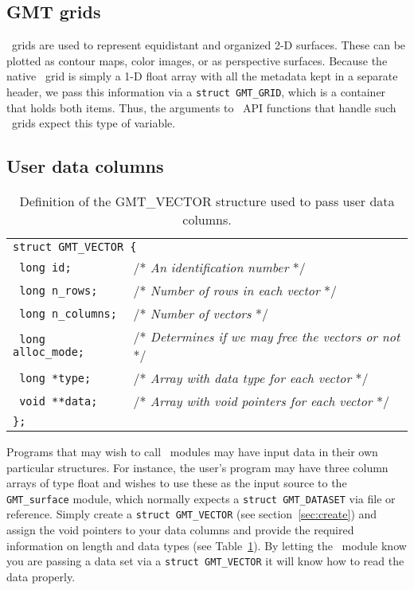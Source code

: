\documentclass{report}
\begin{document}
\subsection{GMT grids}

\GMT\ grids are used to represent equidistant and organized 2-D surfaces.  These can be
plotted as contour maps, color images, or as perspective surfaces.  Because the native
\GMT\ grid is simply a 1-D float array with all the metadata kept in a separate header, we
pass this information via a \texttt{struct GMT\_GRID}, which is a container that holds both items.
Thus, the arguments to \GMT\ API functions that handle such \GMT\ grids expect this type
of variable.

\subsection{User data columns}

\begin{table}[h]
\small
\centering
\begin{tabular}{ll} \hline
\multicolumn{2}{l}{\texttt{struct GMT\_VECTOR \{}} \\ 
\texttt{	long id;}		&       /* \emph{An identification number} */ \\
\texttt{	long n\_rows;}		&       /* \emph{Number of rows in each vector} */ \\
\texttt{	long n\_columns;}	&       /* \emph{Number of vectors}  */\\
\texttt{	long alloc\_mode;}	&       /* \emph{Determines if we may free the vectors or not}  */\\
\texttt{	long *type;}		&       /* \emph{Array with data type for each vector}  */\\
\texttt{	void **data;}		&       /* \emph{Array with void pointers for each vector}  */\\
\texttt{\};}	&        \\  \hline
\end{tabular}
\caption{Definition of the GMT\_VECTOR structure used to pass user data columns.}
\label{tbl:vector}
\end{table}
\noindent
Programs that may wish to call \GMT\ modules may have input data in their own particular
structures.  For instance, the user's program may have three column arrays of type float
and wishes to use these as the input source to the \texttt{GMT\_surface} module, which normally
expects a \texttt{struct GMT\_DATASET} via file or reference.  Simply create a \texttt{struct GMT\_VECTOR}
(see section~\ref{sec:create}) and assign the void pointers to your data columns and provide
the required information on length and data types (see Table~\ref{tbl:vector}).
By letting the \GMT\ module know you are passing a data set via a \texttt{struct GMT\_VECTOR} it will know how to
read the data properly.
\end{document}
